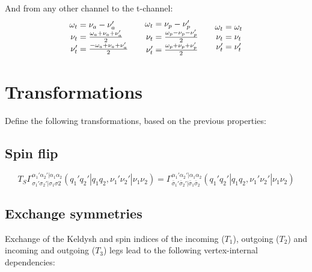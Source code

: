 \documentclass[12pt,a4paper,roman]{article}
\begin{document}
And from any other channel to the t-channel:
\begin{align}
    \begin{array}{r@{\mskip\thickmuskip}l}
    \omega_t &= \nu_a-\nu'_a\\
    \nu_t  &= \frac{ \omega_a+\nu_a+\nu'_a}{2}\\
    \nu'_t &= \frac{-\omega_a+\nu_a+\nu'_a}{2}\\
  \end{array}
  \quad  \begin{array}{r@{\mskip\thickmuskip}l}
    \omega_t &= \nu_p-\nu'_p\\
    \nu_t  &= \frac{\omega_p-\nu_p-\nu'_p}{2}\\
    \nu'_t &= \frac{\omega_p+\nu_p+\nu'_p}{2}\\
  \end{array} \quad
  \begin{array}{r@{\mskip\thickmuskip}l}
    \omega_t &= \omega_t\\
    \nu_t  &= \nu_t \\
    \nu'_t &= \nu'_t\\
  \end{array}
\end{align}





\section*{Transformations}
Define the following transformations, based on the previous properties:
\subsection*{Spin flip}
\begin{equation}
T_S \Gamma^{\alpha_1'\alpha_2'|\alpha_1\alpha_2}_{\sigma_1'\sigma_2'|\sigma_1\sigma2} (q_1'q_2'|q_1q_2, \nu_1'\nu_2'|\nu_1\nu_2) = \Gamma^{\alpha_1'\alpha_2'|\alpha_1\alpha_2}_{\bar{\sigma}_1'\bar{\sigma}_2'|\bar{\sigma}_1\bar{\sigma}_2} (q_1'q_2'|q_1q_2, \nu_1'\nu_2'|\nu_1\nu_2)
\end{equation}

\subsection*{Exchange symmetries}
Exchange of the Keldysh and spin indices of the incoming ($T_1$), outgoing ($T_2$) and incoming and outgoing ($T_3$) legs lead to the following vertex-internal dependencies:
\end{document}
